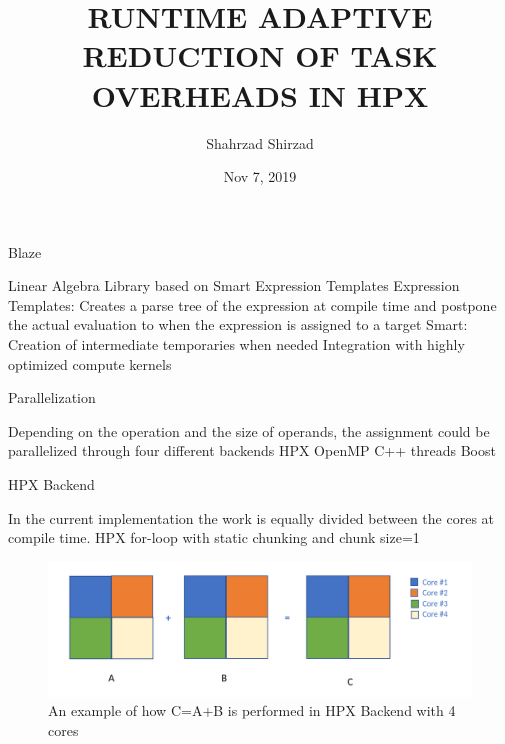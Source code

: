 \documentclass[10pt]{beamer}
\title{RUNTIME ADAPTIVE REDUCTION OF TASK OVERHEADS IN HPX}
\author{Shahrzad Shirzad}
\date{Nov 7, 2019}
\begin{document}
\maketitle



\begin{frame}{Blaze}
\begin{outline}
 Linear Algebra Library based on Smart Expression Templates
 \1Expression Templates:
	\2Creates a parse tree of the expression at compile time and postpone the actual evaluation to when the expression is assigned to a target
\1 Smart: 
	\2Creation of intermediate temporaries when needed
	\2Integration with highly optimized compute kernels
\end{outline}
\end{frame}


\begin{frame}{Parallelization}
	\begin{outline}
		Depending on the operation and the size of operands, the assignment could be parallelized through four different backends
		\1 HPX 
		\1OpenMP
		\1C++ threads
		\1Boost
	\end{outline}
\end{frame}

\begin{frame}{HPX Backend}
	\begin{outline}
		In the current implementation the work is equally divided between the cores at compile time.
		\1 HPX for-loop with static chunking and chunk size=1
		\begin{figure}
			\centering
			\includegraphics[width=0.72\linewidth]{figures/old_backend.png}
			\caption{An example of how C=A+B is performed in HPX Backend with 4 cores}	
		\end{figure}	

	\end{outline}
\end{frame}
\end{document}
